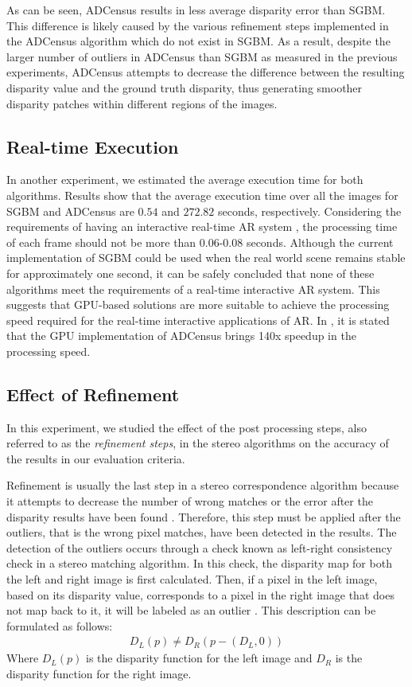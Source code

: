 As can be seen, ADCensus results in less average disparity error than SGBM. This difference is likely caused by the various refinement steps
implemented in the ADCensus algorithm which do not exist in SGBM.
As a result, despite the larger number of outliers in ADCensus than SGBM as measured in the previous experiments,
ADCensus attempts to decrease the difference between the resulting disparity value and the ground truth disparity, thus generating smoother disparity patches
within different regions of the images.

\subsection{Real-time Execution}
In another experiment, we estimated the average execution time for both algorithms. Results show that the average execution time over all the images 
for SGBM and ADCensus are $0.54$ and $272.82$ seconds, respectively.
Considering the requirements of having an interactive real-time AR system \cite{hertz00}, the processing time of each frame should not be more than 0.06-0.08 seconds.
Although the current implementation of SGBM could be used when the real world scene remains stable for approximately one second, it can be safely concluded that
none of these algorithms meet the requirements of a real-time interactive AR system.
This suggests that GPU-based solutions are more suitable to achieve the processing speed required for the real-time 
interactive applications of AR. In \cite{mei11}, it is stated that the GPU implementation of ADCensus brings 140x speedup in the processing speed.

\subsection{Effect of Refinement}
In this experiment, we studied the effect of the post processing steps, also referred to as the \textit{refinement steps}, 
in the stereo algorithms on the accuracy of the results in our evaluation criteria. 

Refinement is usually the last step in a stereo correspondence algorithm because it attempts to decrease the 
number of wrong matches or the error after the disparity results have been found \cite{sch02}. Therefore, this step must be applied after the outliers, that is the wrong pixel matches, 
have been detected in the results.
The detection of the outliers occurs through a check known as left-right consistency check in a stereo matching algorithm. In this check, the disparity map for both
the left and right image is first calculated. Then, if a pixel in the left image, based on its disparity value, corresponds to a pixel in the right image
that does not map back to it, it will be labeled as an outlier \cite{sch02}. This description can be formulated as follows:
\begin{align}
D_{L}(p) \neq D_{R}(p-(D_{L},0))
\end{align}
\noindent
Where $D_{L}(p)$ is the disparity function for the left image and $D_{R}$ is the disparity function for the right image.


